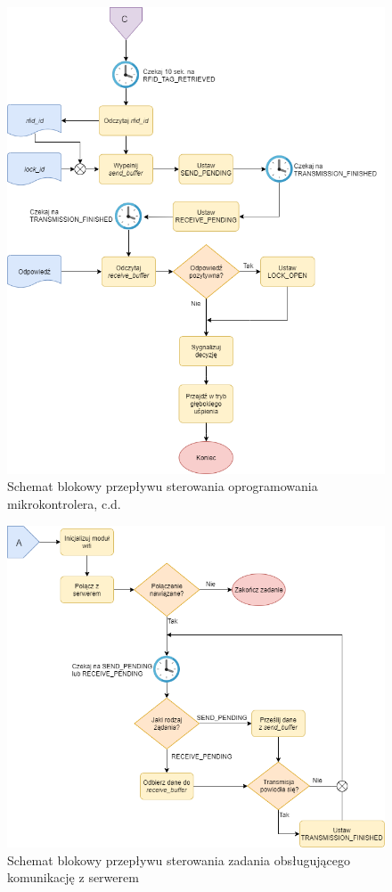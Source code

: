             \begin{figure}[]
                \centering
                \includegraphics[width=\textwidth]{chapters/images/flowchart4.png}
                \caption{Schemat blokowy przepływu sterowania oprogramowania mikrokontrolera, c.d.}
                \label{fig:flowchart4}
            \end{figure}

            \begin{figure}[]
                \centering
                \includegraphics[width=\textwidth]{chapters/images/flowchart2.png}
                \caption{Schemat blokowy przepływu sterowania zadania obsługującego komunikację z serwerem}
                \label{fig:flowchart2}
            \end{figure}


